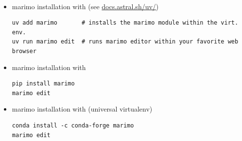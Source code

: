 \documentclass[11pt, serif, mathserif, compress]{beamer}  %
\begin{document}
\begin{frame}[fragile]{}

  \begin {bclogo}[noborder=true, couleur=gray!20, couleurBarre=Chocolate, logo=\raisebox{1mm}{\,\huge{⚙}}, marge=0, margeG=-0.5, margeD=-0.8]
    {\ }
    \smallskip

    \begin{itemize}\setlength\itemsep{2mm}
      
      \item marimo installation with  (see \href{https://docs.astral.sh/uv/}{docs.astral.sh/uv/})
      \vspace*{-3mm}\hspace*{-5mm}%
      \begin{verbatim}
uv add marimo       # installs the marimo module within the virt. env.
uv run marimo edit  # runs marimo editor within your favorite web browser
      \end{verbatim}

      \item marimo installation with 
      \vspace*{-3mm}\begin{verbatim}
pip install marimo
marimo edit
      \end{verbatim}

      \item marimo installation with  (universal virtualenv)
      \vspace*{-3mm}\begin{verbatim}
conda install -c conda-forge marimo
marimo edit
      \end{verbatim}
    
    \end{itemize}

  \end{bclogo}

\end{frame}
\end{document}
